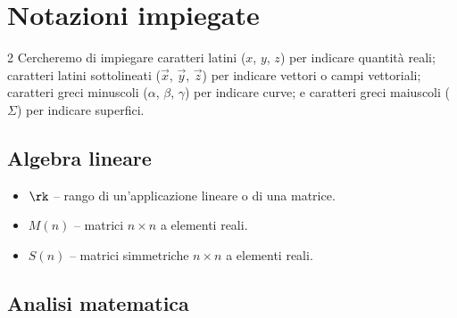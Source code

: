 \chapter*{Notazioni impiegate}
\setlength{\parindent}{2pt}

\begin{multicols*}{2}
      Cercheremo di impiegare caratteri latini ($x$, $y$, $z$) per indicare quantità reali;
      caratteri latini sottolineati ($\vec{x}$, $\vec{y}$, $\vec{z}$) per indicare
      vettori o campi vettoriali; caratteri greci minuscoli ($\alpha$, $\beta$, $\gamma$) per indicare
      curve; e caratteri greci maiuscoli ($\Sigma$) per indicare superfici.

      \section*{Algebra lineare}

      \begin{itemize}
            \item $\rk$ -- rango di un'applicazione lineare o di una matrice.
            \item $M(n)$ -- matrici $n \times n$ a elementi reali.
            \item $S(n)$ -- matrici simmetriche $n \times n$ a elementi reali.
      \end{itemize}

      \section*{Analisi matematica}


\end{multicols*}
